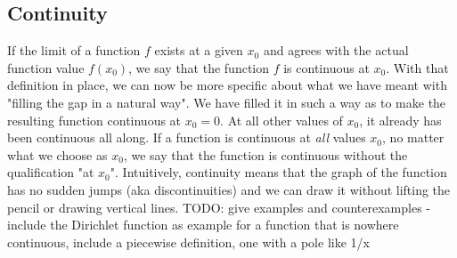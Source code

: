 


\subsection{Continuity}
If the limit of a function $f$ exists at a given $x_0$ and agrees with the actual function value $f(x_0)$, we say that the function $f$ is continuous at $x_0$. With that definition in place, we can now be more specific about what we have meant with "filling the gap in a natural way". We have filled it in such a way as to make the resulting function continuous at $x_0 = 0$. At all other values of $x_0$, it already has been continuous all along. If a function is continuous at \emph{all} values $x_0$, no matter what we choose as $x_0$, we say that the function is continuous without the qualification "at $x_0$". Intuitively, continuity means that the graph of the function has no sudden jumps (aka discontinuities) and we can draw it without lifting the pencil or drawing vertical lines. TODO: give examples and counterexamples - include the Dirichlet function as example for a function that is nowhere continuous, include a piecewise definition, one with a pole like 1/x












